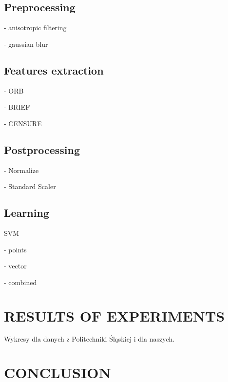 \documentclass[11pt,a4paper]{article}
\begin{document}
\subsection{Preprocessing}

- anisotropic filtering

- gaussian blur

\subsection{Features extraction}

- ORB

- BRIEF

- CENSURE 

\subsection{Postprocessing}

- Normalize

- Standard Scaler 

\subsection{Learning}

SVM

- points

- vector

- combined


\section{RESULTS OF EXPERIMENTS}

Wykresy dla danych z Politechniki Śląskiej i dla naszych.



\section{CONCLUSION}
\end{document}
